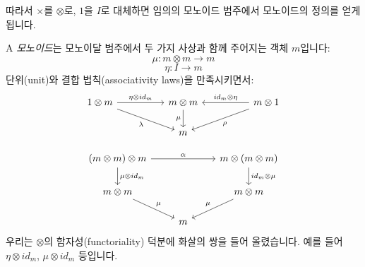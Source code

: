 \documentclass[DaoFP]{subfiles}
\begin{document}
따라서 $\times$를 $\otimes$로, $1$을 $I$로 대체하면 임의의 모노이드 범주에서 모노이드의 정의를 얻게 됩니다.

A \emph{모노이드}는 모노이달 범주에서 두 가지 사상과 함께 주어지는 객체 $m$입니다:
\[ \mu \colon m \otimes m \to m \]
\[ \eta \colon I \to m \]
단위(unit)와 결합 법칙(associativity laws)을 만족시키면서:
\[
 \begin{tikzcd}
 1 \otimes m
 \arrow[rr, "\eta \otimes id_m"]
 \arrow[rrd, "\lambda"']
& & m \otimes m
 \arrow[d, "\mu"']
&& m \otimes 1
 \arrow[ll, "id_m \otimes \eta"']
 \arrow[lld, "\rho"]
 \\
 && m
  \end{tikzcd}
\]

\[
 \begin{tikzcd}
 (m \otimes m) \otimes m 
 \arrow[rr, "\alpha"]
 \arrow[d, "\mu \otimes id_m"]
 &&
 m \otimes (m \otimes m)
 \arrow[d, "id_m \otimes \mu"]
 \\
 m \otimes m 
 \arrow[dr, "\mu"]
& & m \otimes m
 \arrow[dl, "\mu"']
 \\
&  m
 \end{tikzcd}
\]
우리는 $\otimes$의 함자성(functoriality) 덕분에 화살의 쌍을 들어 올렸습니다. 예를 들어 $\eta \otimes id_m$, $\mu \otimes id_m$ 등입니다.
\end{document}
